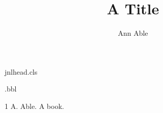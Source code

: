 \begin{filecontents*}[overwrite]{jnlhead.cls}
\renewcommand\maketitle{\par\begingroup\centering{\Large\@title\par}%
  {\@author\thanks{Contents lists available at ScienceDirect. URL: none}\par}\@thanks\endgroup}
\end{filecontents*}
\begin{filecontents*}[overwrite]{\jobname.bbl}
\providecommand{\URLprefix}{URL: }
\begin{thebibliography}{1}
 A. Able. A book.
\end{thebibliography}
\end{filecontents*}
\documentclass{jnlhead}
\usepackage{translations}

\title{A Title}
\author{Ann Able}
\maketitle
Text \cite{able}.



